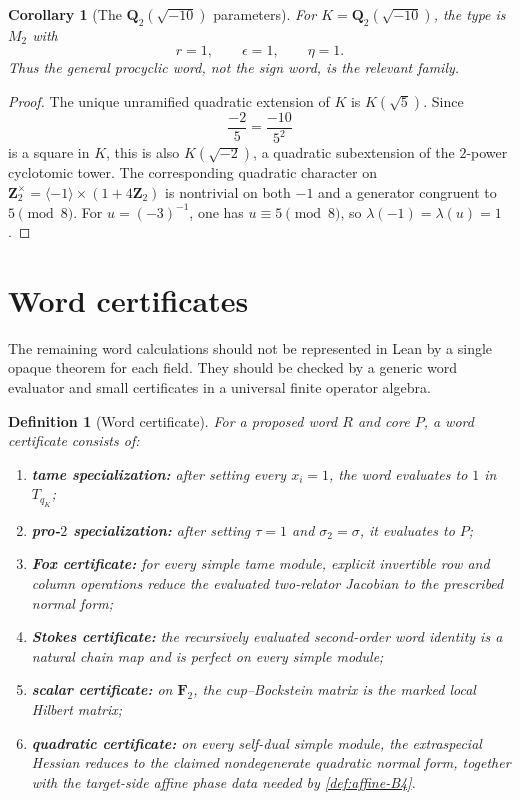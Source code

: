 \documentclass[11pt,reqno]{amsart}
\newtheorem{corollary}[theorem]{Corollary}
\newtheorem{definition}[theorem]{Definition}
\theoremstyle{remark}
\numberwithin{equation}{section}
\newcommand{\Q}{\mathbf Q}
\newcommand{\Z}{\mathbf Z}
\newcommand{\F}{\mathbf F}
\begin{document}
\begin{corollary}[The \(\Q_2(\sqrt{-10})\) parameters]
\label{cor:minus10}
For \(K=\Q_2(\sqrt{-10})\), the type is \(M_2\) with
\[
 r=1,\qquad \epsilon=1,\qquad \eta=1.
\]
Thus the general procyclic word, not the sign word, is the relevant
family.
\end{corollary}

\begin{proof}
The unique unramified quadratic extension of \(K\) is
\(K(\sqrt5)\).  Since
\[
 \frac{-2}{5}=\frac{-10}{5^2}
\]
is a square in \(K\), this is also \(K(\sqrt{-2})\), a quadratic
subextension of the \(2\)-power cyclotomic tower.  The corresponding
quadratic character on
\(\Z_2^\times=\langle-1\rangle\times(1+4\Z_2)\) is nontrivial on both
\(-1\) and a generator congruent to \(5\pmod8\).  For
\(u=(-3)^{-1}\), one has \(u\equiv5\pmod8\), so
\(\lambda(-1)=\lambda(u)=1\).
\end{proof}

\section{Word certificates}

The remaining word calculations should not be represented in Lean by a
single opaque theorem for each field.  They should be checked by a generic
word evaluator and small certificates in a universal finite operator
algebra.

\begin{definition}[Word certificate]\label{def:word-certificate}
For a proposed word \(R\) and core \(P\), a word certificate consists of:
\begin{enumerate}
\item \textbf{tame specialization:} after setting every \(x_i=1\), the
word evaluates to \(1\) in \(T_{q_K}\);
\item \textbf{pro-\(2\) specialization:} after setting \(\tau=1\) and
\(\sigma_2=\sigma\), it evaluates to \(P\);
\item \textbf{Fox certificate:} for every simple tame module, explicit
invertible row and column operations reduce the evaluated two-relator
Jacobian to the prescribed normal form;
\item \textbf{Stokes certificate:} the recursively evaluated second-order
word identity is a natural chain map and is perfect on every simple
module;
\item \textbf{scalar certificate:} on \(\F_2\), the cup--Bockstein matrix
is the marked local Hilbert matrix;
\item \textbf{quadratic certificate:} on every self-dual simple module,
the extraspecial Hessian reduces to the claimed nondegenerate quadratic
normal form, together with the target-side affine phase data needed by
\cref{def:affine-B4}.
\end{enumerate}
\end{definition}
\end{document}
